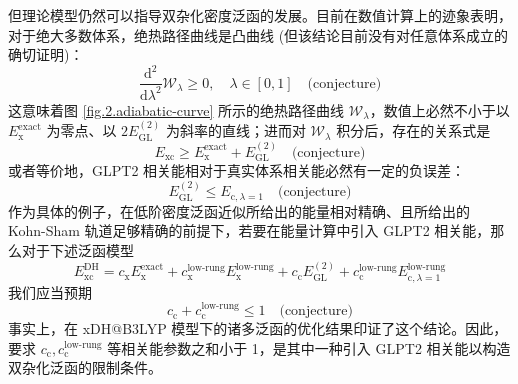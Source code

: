 但理论模型仍然可以指导双杂化密度泛函的发展。目前在数值计算上的迹象表明，对于绝大多数体系，绝热路径曲线是凸曲线\cite{Frydel-Burke.JCP.2000, Fuchs-Burke.JCP.2005, Teale-Helgaker.JCP.2009,Teale-Helgaker.JCP.2010, Carrascal-Burke.JPCM.2015} (但该结论目前没有对任意体系成立的确切证明\cite{Crisostomo-Burke.LMP.2023})：
\begin{equation}
  \frac{\mathrm{d}^2}{\mathrm{d} \lambda^2} \mathcal{W}_{\lambda} \geqslant 0, \quad \lambda \in [0, 1] \quad \text{(conjecture)}
\end{equation}
这意味着图 \ref{fig.2.adiabatic-curve} 所示的绝热路径曲线 $\mathcal{W}_\lambda$，数值上必然不小于以 $E_\mathrm{x}^\mathrm{exact}$ 为零点、以 $2 E_\mathrm{GL}^{(2)}$ 为斜率的直线；进而对 $\mathcal{W}_\lambda$ 积分后，存在的关系式是
\begin{equation}
  E_\mathrm{xc} \geqslant E_\mathrm{x}^\mathrm{exact} + E_\mathrm{GL}^{(2)} \quad \text{(conjecture)}
\end{equation}
或者等价地，GLPT2 相关能相对于真实体系相关能必然有一定的负误差：
\begin{equation}
  E_\mathrm{GL}^{(2)} \leqslant E_{\mathrm{c}, \lambda=1} \quad \text{(conjecture)}
\end{equation}
作为具体的例子，在低阶密度泛函近似所给出的能量相对精确、且所给出的 Kohn-Sham 轨道足够精确的前提下，若要在能量计算中引入 GLPT2 相关能，那么对于下述泛函模型
\begin{equation*}
  E_\mathrm{xc}^\mathrm{DH} = c_\mathrm{x} E_\mathrm{x}^\mathrm{exact} + c_\mathrm{x}^\text{low-rung} E_\mathrm{x}^\text{low-rung} + c_\mathrm{c} E_\mathrm{GL}^{(2)} + c_\mathrm{c}^\text{low-rung} E_{\mathrm{c}, \lambda=1}^\text{low-rung}
\end{equation*}
我们应当预期
\begin{equation*}
  c_\mathrm{c} + c_\mathrm{c}^\text{low-rung} \leqslant 1 \quad \text{(conjecture)}
\end{equation*}
事实上，在 xDH@B3LYP 模型下的诸多泛函的优化结果印证了这个结论\cite{Zhang-Xu.JPCL.2021}。因此，要求 $c_\mathrm{c}, c_\mathrm{c}^\text{low-rung}$ 等相关能参数之和小于 1，是其中一种引入 GLPT2 相关能以构造双杂化泛函的限制条件。

